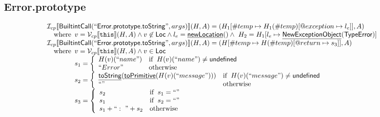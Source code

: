 \documentclass{article}
\newcommand{\SF}[1]{\mbox{\textsf{#1}}}
\newcommand{\TT}[1]{\mbox{\texttt{#1}}}
\newcommand{\wherec}[1]{{\rm where}\begin{array}[t]{l}#1\end{array}}
\newcommand{\ifc}[1]{{\rm if}\begin{array}[t]{l}#1\end{array}}
\newcommand{\owc}{{\rm otherwise}}
\newcommand{\I}{\mathcal{I}}
\newcommand{\V}{\mathcal{V}}
\newcommand{\lbr}{\llbracket}
\newcommand{\rbr}{\rrbracket}
\newcommand{\hf}[1]{\underline{\sf #1}}
\begin{document}
\subsection{Error.prototype}
\[
\begin{array}{l}

\I _{cp}\lbr \SF{BuiltintCall}(``\SF{Error.prototype.toString}",args)\rbr(H,A)
  = (H_1[\#temp \mapsto H_1(\#temp)[@exception \mapsto l_e]], A)\\
\quad\wherec{
  v = \V _{cp}\lbr \TT{this}\rbr (H,A) \land v \not\in \SF{Loc}
  \land l_e = \hf{newLocation}() \land\ H_2=H_1[l_e\mapsto\hf{NewExceptionObject}(\SF{TypeError})] 
  }\\

\I _{cp}\lbr \SF{BuiltintCall}(``\SF{Error.prototype.toString}",args)\rbr(H,A)
  = (H[\#temp \mapsto H(\#temp)[@return \mapsto s_3]], A)\\
\quad\wherec{
  v = \V _{cp}\lbr \TT{this}\rbr (H,A) \land v \in \SF{Loc}\\
  s_1 = \left\{\begin{array}{ll}
    H(v)(``name") & \ifc{H(v)(``name") \neq \SF{undefined}}\\
    ``Error" & \owc \\
    \end{array}\right.\\
  s_2 = \left\{\begin{array}{ll}
    \hf{toString}(\hf{toPrimitive}(H(v)(``message"))) & \ifc{H(v)(``message") \neq \SF{undefined}}\\
    ``" & \owc \\
    \end{array}\right.\\
  s_3 = \left\{\begin{array}{ll}
    s_2 & \ifc{s_1 = ``"}\\
    s_1 & \ifc{s_2 = ``"} \\
    s_1 + ``:\ " + s_2& \owc
    \end{array}\right.
  }\\
\\

\end{array}
\]
\end{document}
